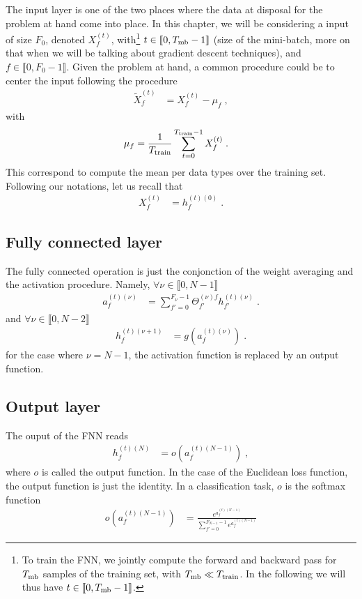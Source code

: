 The input layer is one of the two places where the data at disposal for the problem at hand come into place. In this chapter, we will be considering a input of size $F_0$, denoted $X^{(t)}_{f}$, with\footnote{
To train the FNN, we jointly compute the forward and backward pass for $T_{{\rm mb}}$ samples of the training set, with $T_{{\rm mb}}\ll T_{{\rm train}}$. In the following we will thus have $t\in \llbracket 0, T_{{\rm mb}}-1\rrbracket$.
}
 $t\in \llbracket 0, T_{{\rm mb}}-1\rrbracket$ (size of the  mini-batch, more on that when we will be talking about gradient descent techniques), and $f \in \llbracket 0, F_0-1\rrbracket$. Given the problem at hand, a common procedure could be to center the input following the  procedure
\begin{align}
\tilde{X}^{(t)}_{f}&=X^{(t)}_{f}-\mu_{f}\;,
\end{align}
with
\begin{align}
\mu_{f}&=\frac{1}{T_{{\rm train}}}\sum^{T_{{\rm train}}-1}_{t=0}X^{(t)}_{f}\;.
\end{align}
This correspond to compute the mean per data types over the training set. Following our notations, let us recall that
\begin{align}
X^{(t)}_{f}&=h^{(t)(0)}_{f}\;.
\end{align}

\subsection{Fully connected  layer}

The fully connected operation is just the conjonction of the weight averaging and the activation procedure. Namely, $\forall \nu\in \llbracket 0,N-1 \rrbracket$
\begin{align}
a_{f}^{(t)(\nu)}&=\sum^{F_\nu-1}_{f'=0}\Theta^{(\nu)f}_{f'}h^{(t)(\nu)}_{f'}\;.\label{eq:Weightavg}
\end{align}
and $\forall \nu\in \llbracket 0,N-2 \rrbracket$
\begin{align}
h_{f}^{(t)(\nu+1)}&=g\left(a_{f}^{(t)(\nu)}\right)\;.
\end{align}
for the case where $\nu=N-1$, the activation function is replaced by an output function.



\subsection{Output layer}

The ouput of the FNN reads
 \begin{align}
h_{f}^{(t)(N)}&=o(a_{f}^{(t)(N-1)})\;,
\end{align}
where $o$ is called the output function. In the case of the Euclidean loss function, the output function is just the identity. In a classification task, $o$ is the softmax function
\begin{align}
o\left(a^{(t)(N-1)}_f\right)&=\frac{e^{a^{(t)(N-1)}_f}}{\sum\limits^{F_{N-1}-1}_{f'=0}e^{a^{(t)(N-1)}_{f'}}}
\end{align}


